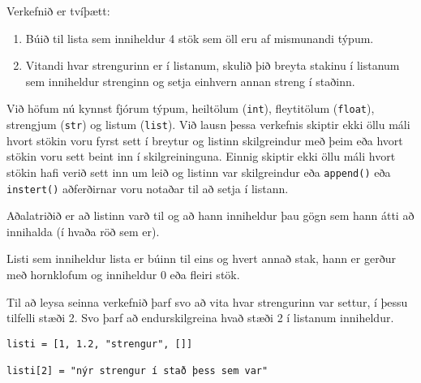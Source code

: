 \begin{exercise}\label{lst2}
		Verkefnið er tvíþætt:
\begin{enumerate}

	\item Búið til lista sem inniheldur 4 stök sem öll eru af mismunandi týpum.
	\item Vitandi hvar strengurinn er í listanum, skulið þið breyta stakinu í listanum sem inniheldur strenginn og setja einhvern annan streng í staðinn.
\end{enumerate}
\end{exercise}
\begin{Answer}[ref={lst2}]
Við höfum nú kynnst fjórum týpum, heiltölum (\texttt{int}), fleytitölum (\texttt{float}), strengjum (\texttt{str}) og listum (\texttt{list}).
Við lausn þessa verkefnis skiptir ekki öllu máli hvort stökin voru fyrst sett í breytur og listinn skilgreindur með þeim eða hvort stökin voru sett beint inn í skilgreininguna.
Einnig skiptir ekki öllu máli hvort stökin hafi verið sett inn um leið og listinn var skilgreindur eða \texttt{append()} eða \texttt{instert()} aðferðirnar voru notaðar til að setja í listann.

Aðalatriðið er að listinn varð til og að hann inniheldur þau gögn sem hann átti að innihalda (í hvaða röð sem er).

Listi sem inniheldur lista er búinn til eins og hvert annað stak, hann er gerður með hornklofum og inniheldur 0 eða fleiri stök.

Til að leysa seinna verkefnið þarf svo að vita hvar strengurinn var settur, í þessu tilfelli stæði 2.
Svo þarf að endurskilgreina hvað stæði 2 í listanum inniheldur. 
\begin{lstlisting}
listi = [1, 1.2, "strengur", []]

listi[2] = "nýr strengur í stað þess sem var"\end{lstlisting}
\end{Answer}

